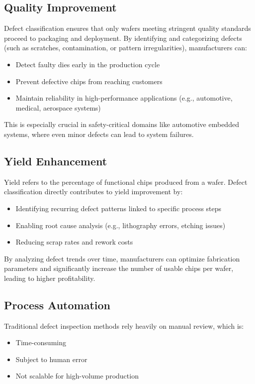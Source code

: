 \subsection {Quality Improvement}

Defect classification ensures that only wafers meeting stringent quality standards proceed to packaging and deployment. By identifying and categorizing defects (such as scratches, contamination, or pattern irregularities), manufacturers can:
\begin{itemize}
\item Detect faulty dies early in the production cycle
\item Prevent defective chips from reaching customers
\item Maintain reliability in high-performance applications (e.g., automotive, medical, aerospace systems)
\end{itemize}

This is especially crucial in safety-critical domains like automotive embedded systems, where even minor defects can lead to system failures.

\subsection {Yield Enhancement}

Yield refers to the percentage of functional chips produced from a wafer. Defect classification directly contributes to yield improvement by:
\begin{itemize}
\item Identifying recurring defect patterns linked to specific process steps
\item Enabling root cause analysis (e.g., lithography errors, etching issues)
\item Reducing scrap rates and rework costs
\end{itemize} 

By analyzing defect trends over time, manufacturers can optimize fabrication parameters and significantly increase the number of usable chips per wafer, leading to higher profitability.

\subsection {Process Automation}

Traditional defect inspection methods rely heavily on manual review, which is:
\begin{itemize}
\item Time-consuming
\item Subject to human error
\item Not scalable for high-volume production
\end{itemize} 

